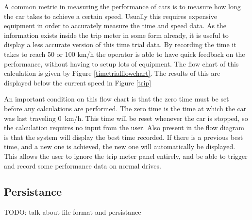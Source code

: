 A common metric in measuring the performance of cars is to measure how long the car takes to achieve a certain speed. Usually this requires expensive equipment in order to accurately measure the time and speed data. As the information exists inside the trip meter in some form already, it is useful to display a less accurate version of this time trial data. By recording the time it takes to reach 50 or 100 km/h the operator is able to have quick feedback on the performance, without having to setup lots of equipment. The flow chart of this calculation is given by Figure \ref{timetrialflowchart}. The results of this are displayed below the current speed in Figure \ref{trip}


An important condition on this flow chart is that the zero time must be set before any calculations are performed. The zero time is the time at which the car was last traveling 0~km/h. This time will be reset whenever the car is stopped, so the calculation requires no input from the user. Also present in the flow diagram is that the system will display the best time recorded. If there is a previous best time, and a new one is achieved, the new one will automatically be displayed. This allows the user to ignore the trip meter panel entirely, and be able to trigger and record some performance data on normal drives.

\subsection{Persistance}

TODO: talk about file format and persistance



